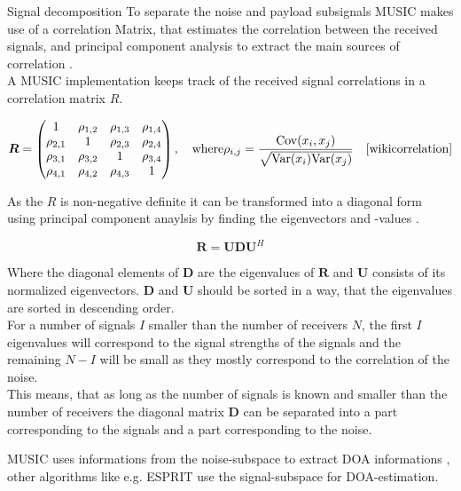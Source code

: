 \begin{subchapter}{Signal decomposition}
  To separate the noise and payload subsignals
  MUSIC makes use of a correlation Matrix,
  that estimates the correlation between the received
  signals, and principal component analysis to
  extract the main sources of correlation \cite{vibergottersten1991}. \\

  A MUSIC implementation keeps track of the received signal
  correlations in a correlation matrix $R$.

  \begin{equation}
    \bm{R} =
    \begin{pmatrix}
      1          & \rho_{1,2} & \rho_{1,3} & \rho_{1,4} \\
      \rho_{2,1} &          1 & \rho_{2,3} & \rho_{2,4} \\
      \rho_{3,1} & \rho_{3,2} &          1 & \rho_{3,4} \\
      \rho_{4,1} & \rho_{4,2} & \rho_{4,3} &          1 \\
    \end{pmatrix} , \quad \text{where}
    \rho_{i,j} = \frac{\mathrm{Cov}(x_{i}, x_{j})}{\sqrt{\mathrm{Var}(x_{i})\mathrm{Var}(x_{j})}}
    \quad \text{\cite{wikicorrelation}}
  \end{equation}

  As the $R$ is non-negative definite \cite[p. 9]{girdmusic}
  it can be transformed into a diagonal form using
  principal component anaylsis by finding the eigenvectors and -values
  \cite[p. 325]{bronstein2016}.

  \begin{equation}
    \bm{R} = \bm{U} \bm{D} \bm{U}^{H}
  \end{equation}

  Where the diagonal elements of $\bm{D}$
  are the eigenvalues of $\bm{R}$ and $\bm{U}$
  consists of its normalized eigenvectors.
  $\bm{D}$ and $\bm{U}$ should be sorted in a way,
  that the eigenvalues are sorted in descending order. \\

  For a number of signals $I$ smaller than the
  number of receivers $N$, the first $I$ eigenvalues
  will correspond to the signal strengths of the signals
  and the remaining $N - I$ will be small as they
  mostly correspond to the correlation of the noise. \\

  This means, that as long as the number of signals is
  known and smaller than the number of receivers the
  diagonal matrix $\bm{D}$ can be separated into a part
  corresponding to the signals and a part corresponding to
  the noise.

  MUSIC uses informations from the noise-subspace to extract
  DOA informations \cite{madisetti2010}, other algorithms
  like e.g. ESPRIT use the signal-subspace for DOA-estimation.


\end{subchapter}
